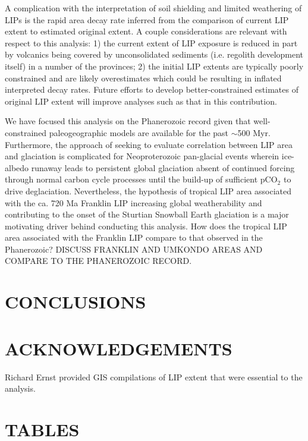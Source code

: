 \documentclass[11pt,letterpaper]{article}
\begin{document}
A complication with the interpretation of soil shielding and limited weathering of LIPs is the rapid area decay rate inferred from the comparison of current LIP extent to estimated original extent. A couple considerations are relevant with respect to this analysis: 1) the current extent of LIP exposure is reduced in part by volcanics being covered by unconsolidated sediments (i.e. regolith development itself) in a number of the provinces; 2) the initial LIP extents are typically poorly constrained and are likely overestimates which could be resulting in inflated interpreted decay rates. Future efforts to develop better-constrained estimates of original LIP extent will improve analyses such as that in this contribution.

We have focused this analysis on the Phanerozoic record given that well-constrained paleogeographic models are available for the past $\sim$500 Myr. Furthermore, the approach of seeking to evaluate correlation between LIP area and glaciation is complicated for Neoproterozoic pan-glacial events wherein ice-albedo runaway leads to persistent global glaciation absent of continued forcing through normal carbon cycle processes until the build-up of sufficient pCO$_2$ to drive deglaciation. Nevertheless, the  hypothesis of tropical LIP area associated with the ca. 720 Ma Franklin LIP increasing global weatherability and contributing to the onset of the Sturtian Snowball Earth glaciation is a major motivating driver behind conducting this analysis. How does the tropical LIP area associated with the Franklin LIP compare to that observed in the Phanerozoic? DISCUSS FRANKLIN AND UMKONDO AREAS AND COMPARE TO THE PHANEROZOIC RECORD. 

\section*{CONCLUSIONS}

\section*{ACKNOWLEDGEMENTS \label{sec:ACKNOWLEDGEMENTS}}

Richard Ernst provided GIS compilations of LIP extent that were essential to the analysis.

\section*{TABLES}
\end{document}

